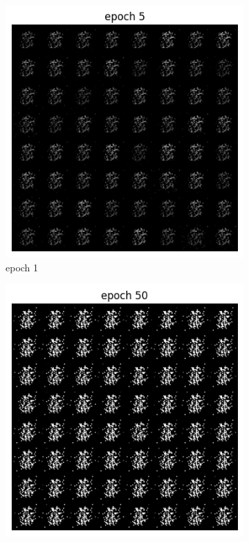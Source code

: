 \documentclass[a4paper]{article}
\theoremstyle{definition}
\newenvironment{soln}{
	\leavevmode\color{blue}\ignorespaces
}{}
\begin{document}
\begin{enumerate} [label=(\alph*)]
\begin{soln}
		\begin{figure}[H]
			\centering
			\begin{subfigure}[b]{0.3\textwidth}
				\centering
				\includegraphics[width=\textwidth]{epoch_5_q2.png}
				\caption{epoch 1}
			\end{subfigure}
			\hfill
			\begin{subfigure}[b]{0.3\textwidth}
				\centering
				\includegraphics[width=\textwidth]{epoch_50_q2.png}

\end{subfigure}
\end{figure}
\end{soln}
\end{enumerate}
\end{document}
